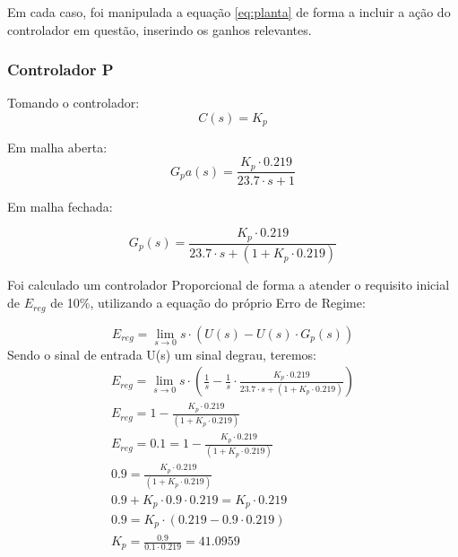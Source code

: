 \documentclass[
	article,			%
	11pt,				%
	oneside,			%
	a4paper,			%
	section=TITLE,		%
	english,			%
	brazil,				%
	sumario=tradicional
	]{abntex2}
\begin{document}
    Em cada caso, foi manipulada a equação \ref{eq:planta} de forma a incluir a ação do controlador em questão, inserindo os ganhos relevantes.
\subsubsection{Controlador P}
Tomando o controlador:
\begin{equation}
C(s) = K_p
\end{equation}

Em malha aberta:
\begin{equation}
    G_pa(s) = \frac{K_p \cdot 0.219}{23.7 \cdot s + 1}
     \label{eq:planta-com-p}
\end{equation}

Em malha fechada:

\begin{equation}
 G_p(s) = \frac{K_p \cdot 0.219}{23.7 \cdot s + (1 + K_p \cdot 0.219)}
\end{equation}

    Foi calculado um controlador Proporcional de forma a atender o requisito inicial de $E_{reg}$ de 10\%, utilizando a equação do próprio Erro de Regime:
    
    \begin{equation}
     E_{reg} = \lim_{s \to 0} s \cdot \left( U(s) - U(s) \cdot G_p(s) \right)
    \label{eq:e-reg}
    \end{equation}
    Sendo o sinal de entrada U(s) um sinal degrau, teremos:
    \begin{equation} \begin{split}
        E_{reg} = \lim_{s \to 0} s \cdot \left( \frac{1}{s} - \frac{1}{s} \cdot \frac{K_p \cdot 0.219}{23.7 \cdot s + (1 + K_p \cdot 0.219)} \right) \\
        E_{reg} = 1 -\frac{K_p \cdot 0.219}{(1 + K_p \cdot 0.219)} \\
        E_{reg} = 0.1 = 1 -\frac{K_p \cdot 0.219}{(1 + K_p \cdot 0.219)} \\
        0.9 = \frac{K_p \cdot 0.219}{(1 + K_p \cdot 0.219)} \\
        0.9 + K_p \cdot 0.9 \cdot 0.219 = K_p \cdot 0.219 \\
        0.9 = K_p \cdot  (0.219 - 0.9 \cdot 0.219) \\ 
        K_p = \frac{0.9}{0.1 \cdot 0.219} = 41.0959 \\
    \end{split} \label{eq:calc-e-reg} \end{equation}
    
\end{document}
